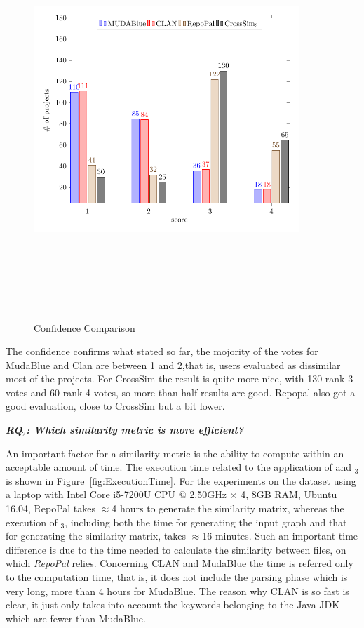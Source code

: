 \begin{figure}[!h]
\includegraphics[width=10cm,height=15cm,keepaspectratio]{images/Confidence.pdf}
\centering
\caption{Confidence Comparison}
\label{fig:Confidence}
\end{figure}

The confidence confirms what stated so far, the mojority of the votes for MudaBlue and Clan are between 1 and 2,that is, users evaluated as dissimilar most of the projects. For CrossSim the result is quite more nice, with 130 rank 3 votes and 60 rank 4 votes, so more than half results are good. Repopal also got a good evaluation, close to CrossSim but a bit lower.

\newcommand{\rqsecond}{RQ$_2$: Which similarity metric is more efficient?}\textit{\textbf{\rqsecond}} 

An important factor for a similarity metric is the ability to compute within an acceptable amount of time. The execution time related to the application of \RepoPal and \CrossSimA$_{3}$ is shown in Figure~\ref{fig:ExecutionTime}. For the experiments on the dataset using a laptop with Intel Core i5-7200U CPU @ 2.50GHz $\times$ 4, 8GB RAM, Ubuntu 16.04, RepoPal takes $\approx$4 hours to generate the similarity matrix, whereas the execution of \CrossSimA$_{3}$, including both the time for generating the input graph and that for generating the similarity matrix, takes $\approx$16 minutes. Such an important time difference is due to the time needed to calculate the similarity between  files, on which \textit{RepoPal} relies. Concerning CLAN and MudaBlue the time is referred only to the computation time, that is, it does not include the parsing phase which is very long, more than 4 hours for MudaBlue. The reason why CLAN is so fast is clear, it just only takes into account the keywords belonging to the Java JDK which are fewer than MudaBlue.


